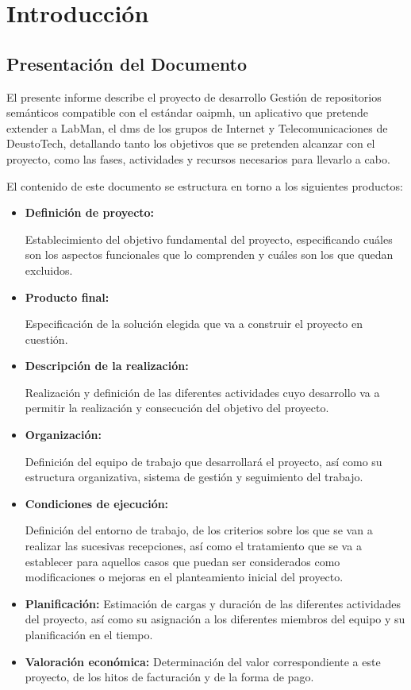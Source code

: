 \chapter{Introducción}\label{cha:introduccion}

\section{Presentación del Documento}

El presente informe describe el proyecto de desarrollo Gestión de repositorios semánticos compatible con el estándar \acrshort{oaipmh}, un aplicativo que pretende extender a LabMan, el \acrlong{dms} de los grupos de Internet y Telecomunicaciones de DeustoTech, detallando tanto los objetivos que se pretenden alcanzar con el proyecto, como las fases, actividades y recursos necesarios para llevarlo a cabo.

El contenido de este documento se estructura en torno a los siguientes productos:

\begin{itemize}
	\item \textbf{Definición de proyecto:}
		
	Establecimiento del objetivo fundamental del proyecto, especificando cuáles son los aspectos funcionales que lo comprenden y cuáles son los que quedan excluidos.
	
	\item \textbf{Producto final:}
		
	Especificación de la solución elegida que va a construir el proyecto en cuestión.
	
	\item \textbf{Descripción de la realización:}

	Realización y definición de las diferentes actividades cuyo desarrollo va a permitir la realización y consecución del objetivo del proyecto.

	\item \textbf{Organización:}
	
	Definición del equipo de trabajo que desarrollará el proyecto, así como su estructura organizativa, sistema de gestión y seguimiento del trabajo.

	\item \textbf{Condiciones de ejecución:}

	Definición del entorno de trabajo, de los criterios sobre los que se van a realizar las sucesivas recepciones, así como el tratamiento que se va a establecer para aquellos casos que puedan ser considerados como modificaciones o mejoras en el planteamiento inicial del proyecto.

	\item \textbf{Planificación:}
	Estimación de cargas y duración de las diferentes actividades del proyecto, así como su asignación a los diferentes miembros del equipo y su planificación en el tiempo.

	\item \textbf{Valoración económica:}
	Determinación del valor correspondiente a este proyecto, de los hitos de facturación y de la forma de pago.
\end{itemize}

